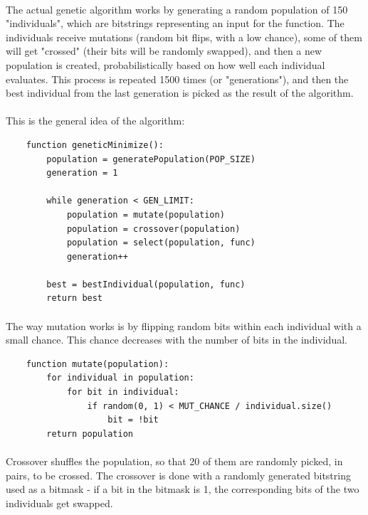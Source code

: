\documentclass{article}
\begin{document}
    \paragraph{}
    The actual genetic algorithm works by generating a random population of 150 "individuals", which are bitstrings representing an input for the function. The individuals receive mutations (random bit flips, with a low chance), some of them will get "crossed" (their bits will be randomly swapped), and then a new population is created, probabilistically based on how well each individual evaluates. This process is repeated 1500 times (or "generations"), and then the best individual from the last generation is picked as the result of the algorithm.
    \paragraph{}
    This is the general idea of the algorithm:

    \begin{verbatim}
    function geneticMinimize():
        population = generatePopulation(POP_SIZE)
        generation = 1

        while generation < GEN_LIMIT:
            population = mutate(population)
            population = crossover(population)
            population = select(population, func)
            generation++
        
        best = bestIndividual(population, func)
        return best
    \end{verbatim}

    \paragraph{}
    The way mutation works is by flipping random bits within each individual with a small chance. This chance decreases with the number of bits in the individual.

    \begin{verbatim}
    function mutate(population):
        for individual in population:
            for bit in individual:
                if random(0, 1) < MUT_CHANCE / individual.size()
                    bit = !bit
        return population
    \end{verbatim}

    \paragraph{}
    Crossover shuffles the population, so that 20 of them are randomly picked, in pairs, to be crossed. The crossover is done with a randomly generated bitstring used as a bitmask - if a bit in the bitmask is 1, the corresponding bits of the two individuals get swapped.
\end{document}

